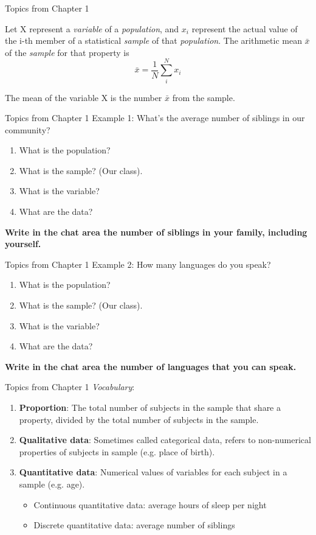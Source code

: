 \documentclass{beamer}
\begin{document}
\begin{frame}{Topics from Chapter 1}
\begin{tcolorbox}[colback=orange!10,colframe=orange!100,title=Mean: Definition 1]
Let X represent a \textit{variable} of a \textit{population}, and $x_i$ represent the actual value of the i-th member of a statistical \textit{sample} of that \textit{population}.  The arithmetic mean $\bar{x}$ of the \textit{sample} for that property is
\begin{equation}
\bar{x} = \frac{1}{N}\sum_i^{N} x_i
\end{equation}
\end{tcolorbox}
The mean of the variable X is the number $\bar{x}$ from the sample.
\end{frame}

\begin{frame}{Topics from Chapter 1}
Example 1: What's the average number of siblings in our community?
\begin{enumerate}
\item What is the population?
\item What is the sample?  (Our class).
\item What is the variable?
\item What are the data?
\end{enumerate}
\textbf{Write in the chat area the number of siblings in your family, including yourself.}
\end{frame}

\begin{frame}{Topics from Chapter 1}
Example 2: How many languages do you speak?
\begin{enumerate}
\item What is the population?
\item What is the sample?  (Our class).
\item What is the variable?
\item What are the data?
\end{enumerate}
\textbf{Write in the chat area the number of languages that you can speak.}
\end{frame}

\begin{frame}{Topics from Chapter 1}
\small
\textit{Vocabulary}:
\begin{enumerate}
\item \textbf{Proportion}: The total number of subjects in the sample that share a property, divided by the total number of subjects in the sample.
\item \textbf{Qualitative data}: Sometimes called categorical data, refers to non-numerical properties of subjects in sample (e.g. place of birth).
\item \textbf{Quantitative data}: Numerical values of variables for each subject in a sample (e.g. age).
\begin{itemize}
\item Continuous quantitative data: average hours of sleep per night
\item Discrete quantitative data: average number of siblings
\end{itemize}
\end{enumerate}
\end{frame}
\end{document}
